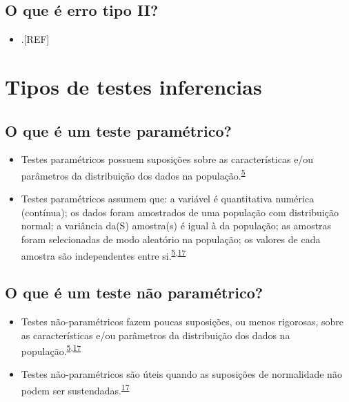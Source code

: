 \documentclass[
]{book}
\providecommand{\tightlist}{%
  \setlength{\itemsep}{0pt}\setlength{\parskip}{0pt}}
\begin{document}
\hypertarget{o-que-uxe9-erro-tipo-ii}{%
\subsection{O que é erro tipo II?}\label{o-que-uxe9-erro-tipo-ii}}

\begin{itemize}
\tightlist
\item
  .{[}REF{]}
\end{itemize}

\hypertarget{tipos-testes-inferenciais}{%
\section{Tipos de testes inferencias}\label{tipos-testes-inferenciais}}

\hypertarget{o-que-uxe9-um-teste-paramuxe9trico}{%
\subsection{O que é um teste paramétrico?}\label{o-que-uxe9-um-teste-paramuxe9trico}}

\begin{itemize}
\item
  Testes paramétricos possuem suposições sobre as características e/ou parâmetros da distribuição dos dados na população.\textsuperscript{\protect\hyperlink{ref-vetter2017}{5}}
\item
  Testes paramétricos assumem que: a variável é quantitativa numérica (contínua); os dados foram amostrados de uma população com distribuição normal; a variância da(S) amostra(s) é igual à da população; as amostras foram selecionadas de modo aleatório na população; os valores de cada amostra são independentes entre si.\textsuperscript{\protect\hyperlink{ref-vetter2017}{5},\protect\hyperlink{ref-Ali2016}{17}}
\end{itemize}

\hypertarget{o-que-uxe9-um-teste-nuxe3o-paramuxe9trico}{%
\subsection{O que é um teste não paramétrico?}\label{o-que-uxe9-um-teste-nuxe3o-paramuxe9trico}}

\begin{itemize}
\item
  Testes não-paramétricos fazem poucas suposições, ou menos rigorosas, sobre as características e/ou parâmetros da distribuição dos dados na população.\textsuperscript{\protect\hyperlink{ref-vetter2017}{5},\protect\hyperlink{ref-Ali2016}{17}}
\item
  Testes não-paramétricos são úteis quando as suposições de normalidade não podem ser sustendadas.\textsuperscript{\protect\hyperlink{ref-Ali2016}{17}}
\end{itemize}
\end{document}
